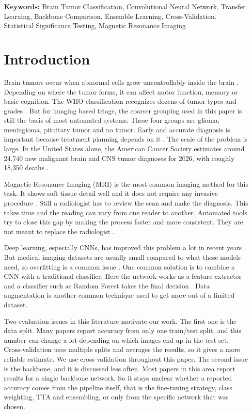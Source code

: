 \documentclass[11pt]{article}
\begin{document}
\begin{abstract}
\end{abstract}

\noindent\textbf{Keywords:} Brain Tumor Classification, Convolutional Neural Network, Transfer Learning, Backbone Comparison, Ensemble Learning, Cross-Validation, Statistical Significance Testing, Magnetic Resonance Imaging

\section{Introduction}
\label{sec:intro}

Brain tumors occur when abnormal cells grow uncontrollably inside the brain \cite{dorfner2025review}. Depending on where the tumor forms, it can affect motor function, memory or basic cognition. The WHO classification recognizes dozens of tumor types and grades \cite{louis2021who}. But for imaging based triage, the coarser grouping used in this paper is still the basis of most automated systems. These four groups are glioma, meningioma, pituitary tumor and no tumor. Early and accurate diagnosis is important because treatment planning depends on it \cite{dorfner2025review}. The scale of the problem is large. In the United States alone, the American Cancer Society estimates around 24,740 new malignant brain and CNS tumor diagnoses for 2026, with roughly 18,350 deaths \cite{acs2026braintumor}.

Magnetic Resonance Imaging (MRI) is the most common imaging method for this task. It shows soft tissue detail well and it does not require any invasive procedure \cite{dorfner2025review}. Still a radiologist has to review the scan and make the diagnosis. This takes time and the reading can vary from one reader to another. Automated tools try to close this gap by making the process faster and more consistent. They are not meant to replace the radiologist \cite{karagoz2024resvit}.

Deep learning, especially CNNs, has improved this problem a lot in recent years \cite{dorfner2025review, kaifi2024enhancing}. But medical imaging datasets are usually small compared to what these models need, so overfitting is a common issue \cite{karagoz2024resvit}. One common solution is to combine a CNN with a traditional classifier. Here the network works as a feature extractor and a classifier such as Random Forest takes the final decision \cite{alzoghby2023dual}. Data augmentation is another common technique used to get more out of a limited dataset.

Two evaluation issues in this literature motivate our work. The first one is the data split. Many papers report accuracy from only one train/test split, and this number can change a lot depending on which images end up in the test set. Cross-validation uses multiple splits and averages the results, so it gives a more reliable estimate. We use cross-validation throughout this paper. The second issue is the backbone, and it is discussed less often. Most papers in this area report results for a single backbone network. So it stays unclear whether a reported accuracy comes from the pipeline itself, that is the fine-tuning strategy, class weighting, TTA and ensembling, or only from the specific network that was chosen.
\end{document}
